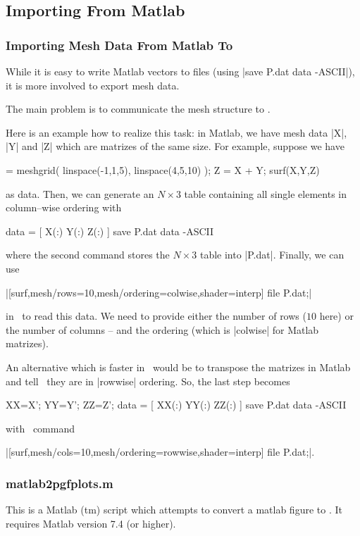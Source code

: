 {\begin{pgfgraphicnamed}
\subsection{Importing From Matlab}

\subsubsection{Importing Mesh Data From Matlab To \PGFPlots}
While it is easy to write Matlab vectors to files (using |save P.dat data -ASCII|), it is more involved to export mesh data.

The main problem is to communicate the mesh structure to \PGFPlots.

Here is an example how to realize this task: in Matlab, we have mesh data |X|, |Y| and |Z| which are matrizes of the same size. For example, suppose we have

\begin{codeexample} = meshgrid( linspace(-1,1,5), linspace(4,5,10) );
Z = X + Y;
surf(X,Y,Z)
\end{codeexample}
\noindent as data. Then, we can generate an $N \times 3$ table containing all single elements in column--wise ordering with

\begin{codeexample}
data = [ X(:) Y(:) Z(:) ]
save P.dat data -ASCII
\end{codeexample}
\noindent where the second command stores the $N \times 3$ table into |P.dat|. Finally, we can use 

|[surf,mesh/rows=10,mesh/ordering=colwise,shader=interp] file {P.dat};|

in \PGFPlots\ to read this data. We need to provide either the number of rows ($10$ here) or the number of columns -- and the ordering (which is |colwise| for Matlab matrizes).

An alternative which is faster in \PGFPlots\ would be to transpose the matrizes in Matlab and tell \PGFPlots\ they are in |rowwise| ordering. So, the last step becomes

\begin{codeexample}
XX=X'; YY=Y'; ZZ=Z';
data = [ XX(:) YY(:) ZZ(:) ]
save P.dat data -ASCII
\end{codeexample}
\noindent with \PGFPlots\ command

|[surf,mesh/cols=10,mesh/ordering=rowwise,shader=interp] file {P.dat};|.

\subsubsection{matlab2pgfplots.m}
This is a Matlab (tm) script which attempts to convert a matlab figure to \PGFPlots. It requires Matlab version 7.4 (or higher).


\end{pgfgraphicnamed}}
